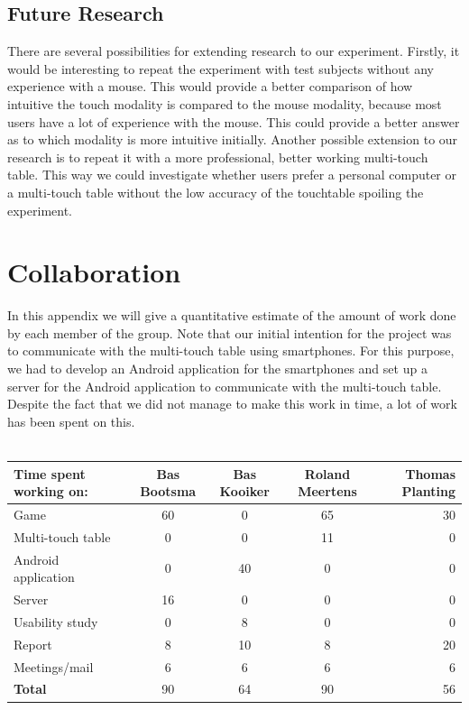 \documentclass[a4paper,10pt]{report}
\begin{document}
\section{Future Research}
There are several possibilities for extending research to our experiment.
Firstly, it would be interesting to repeat the experiment with test subjects without any experience with a mouse.
This would provide a better comparison of how intuitive the touch modality is compared to the mouse modality, because most users have a lot of experience with the mouse. This could provide a better answer as to which modality is more intuitive initially. Another possible extension to our research is to repeat it with a more professional, better working multi-touch table. This way we could investigate whether users prefer a personal computer or a multi-touch table without the low accuracy of the touchtable spoiling the experiment. 

\appendix
\chapter{Collaboration}
\label{chap:collaboration}

In this appendix we will give a quantitative estimate of the amount of work done by each member of the group.
Note that our initial intention for the project was to communicate with the multi-touch table using smartphones.
For this purpose, we had to develop an Android application for the smartphones and set up a server for the Android application to communicate with the multi-touch table.
Despite the fact that we did not manage to make this work in time, a lot of work has been spent on this.
\\\\
\begin{adjustbox}{center}
	\begin{tabular}{| l | c | c | c | r |} \hline                              
		\textbf{Time spent working on:}  & Bas Bootsma & Bas Kooiker & Roland Meertens & Thomas Planting \\ \hline
		Game& 60 & 0 &  65&30\\ \hline
		Multi-touch table& 0 & 0&11&0 \\ \hline
		Android application& 0 & 40&0&0 \\ \hline
		Server &16 & 0 &0&0\\ \hline
		Usability study&0&8&0&0\\ \hline
		Report &8 & 10&8&20\\ \hline
		Meetings/mail &6&6&6&6\\ \hline
		\textbf{Total}&90&64&90&56\\ \hline
	\end{tabular}
\end{adjustbox}




\end{document}
